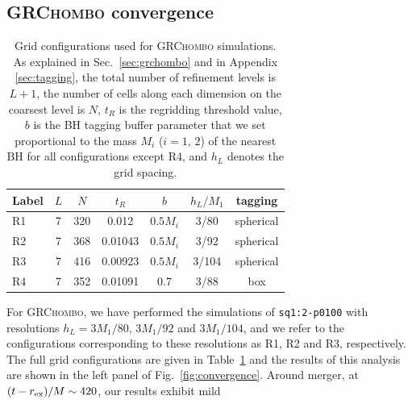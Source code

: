 \documentclass[floats,floatfix,showpacs,amssymb,prd,twocolumn,superscriptaddress,nofootinbib,nolongbibliography,reprint]{revtex4-2}
\newcommand{\mr}[1]{{\textcolor{cyan}{\sf{[MR: #1]}} }}
\newcommand{\us}[1]{{\textcolor{teal}{\sf{[US: #1]}} }}
\begin{document}
\subsection{\textsc{GRChombo} convergence}
\begin{table}[t]
{
    \centering
    \begin{ruledtabular}
    \begin{tabular}{l|cccccc}
        Label & $L$ & $N$ & $t_R$ & $b$ & $h_L/M_1$ & tagging\\
        \hline
        R1 & 7 & 320 & 0.012 & $0.5M_i$ & 3/80 & spherical \\
        R2 & 7 & 368 & 0.01043 & $0.5M_i$ & 3/92 & spherical\\
        R3 & 7 & 416 & 0.00923 & $0.5M_i$ & 3/104 & spherical\\
        R4 & 7 & 352 & 0.01091 & 0.7 & 3/88 & box\\
    \end{tabular}
    \end{ruledtabular}
}
    
    \caption{Grid configurations used for \textsc{GRChombo} simulations.
    As explained in Sec.~\ref{sec:grchombo} and in Appendix \ref{sec:tagging},
    the total 
    number of refinement levels is $L+1$, the number of cells along each
    dimension on the coarsest level is $N$, $t_R$ is the regridding 
    threshold value, $b$ is the BH tagging buffer parameter
    that we
    set proportional to the mass $M_i$ ($i=1,\,2$)
    of the nearest BH for all configurations except R4, 
    and $h_L$ denotes the grid spacing.
    }
    \label{tab:grchombo-grids}
\end{table}
For \textsc{GRChombo}, we have performed the simulations of 
\texttt{sq1:2-p0100} with resolutions $h_L=3M_1/80$, $3M_1/92$ and 
$3M_1/104$, and we refer to the configurations corresponding to these 
resolutions as R1, R2 and R3, respectively.
The full grid configurations 
are given in Table~\ref{tab:grchombo-grids} and the results of this 
analysis are shown in the left panel of Fig.~\ref{fig:convergence}. Around
merger, at $(t-r_{\rm ex})/M\sim 420$, our results exhibit mild
\end{document}
